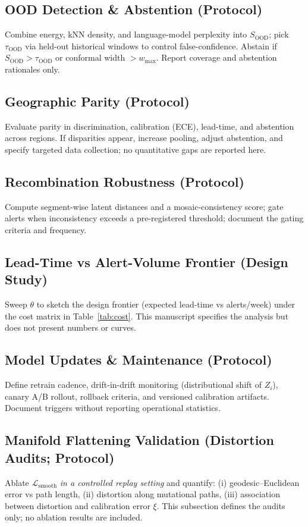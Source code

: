 \documentclass[11pt]{article}
\begin{document}
\subsection{OOD Detection \& Abstention (Protocol)}
\label{sec:ood}
Combine energy, kNN density, and language-model perplexity into $S_{\text{OOD}}$; pick $\tau_{\text{OOD}}$ via held-out historical windows to control false-confidence. Abstain if $S_{\text{OOD}}>\tau_{\text{OOD}}$ or conformal width $>w_{\max}$. Report coverage and abstention rationales only.

\subsection{Geographic Parity (Protocol)}
\label{sec:geo}
Evaluate parity in discrimination, calibration (ECE), lead-time, and abstention across regions. If disparities appear, increase pooling, adjust abstention, and specify targeted data collection; no quantitative gaps are reported here.

\subsection{Recombination Robustness (Protocol)}
\label{sec:recomb}
Compute segment-wise latent distances and a mosaic-consistency score; gate alerts when inconsistency exceeds a pre-registered threshold; document the gating criteria and frequency.

\subsection{Lead-Time vs Alert-Volume Frontier (Design Study)}
\label{sec:pareto}
Sweep $\theta$ to sketch the design frontier (expected lead-time vs alerts/week) under the cost matrix in Table~\ref{tab:cost}. This manuscript specifies the analysis but does not present numbers or curves.

\subsection{Model Updates \& Maintenance (Protocol)}
\label{sec:maint}
Define retrain cadence, drift-in-drift monitoring (distributional shift of $Z_i$), canary A/B rollout, rollback criteria, and versioned calibration artifacts. Document triggers without reporting operational statistics.

\subsection{Manifold Flattening Validation (Distortion Audits; Protocol)}
\label{sec:flattening}
Ablate $\mathcal{L}_{\text{smooth}}$ \emph{in a controlled replay setting} and quantify: (i) geodesic--Euclidean error vs path length, (ii) distortion along mutational paths, (iii) association between distortion and calibration error $\xi$. This subsection defines the audits only; no ablation results are included.
\end{document}
